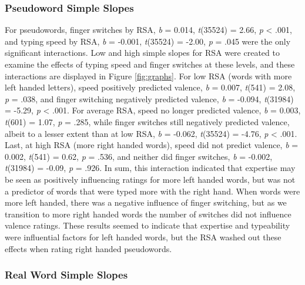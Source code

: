 \documentclass[english,man, mask]{apa6}
\theoremstyle{definition}
\theoremstyle{definition}
\theoremstyle{definition}
\theoremstyle{remark}
\begin{document}
\subsubsection{Pseudoword Simple Slopes}\label{pseudoword-simple-slopes}

For pseudowords, finger switches by RSA, \emph{b} = 0.014,
\emph{t}(35524) = 2.66, \emph{p} \textless{} .001, and typing speed by
RSA, \emph{b} = -0.001, \emph{t}(35524) = -2.00, \emph{p} = .045 were
the only significant interactions. Low and high simple slopes for RSA
were created to examine the effects of typing speed and finger switches
at these levels, and these interactions are displayed in Figure
\ref{fig:graphs}. For low RSA (words with more left handed letters),
speed positively predicted valence, \emph{b} = 0.007, \emph{t}(541) =
2.08, \emph{p} = .038, and finger switching negatively predicted
valence, \emph{b} = -0.094, \emph{t}(31984) = -5.29, \emph{p}
\textless{} .001. For average RSA, speed no longer predicted valence,
\emph{b} = 0.003, \emph{t}(601) = 1.07, \emph{p} = .285, while finger
switches still negatively predicted valence, albeit to a lesser extent
than at low RSA, \emph{b} = -0.062, \emph{t}(35524) = -4.76, \emph{p}
\textless{} .001. Last, at high RSA (more right handed words), speed did
not predict valence, \emph{b} = 0.002, \emph{t}(541) = 0.62, \emph{p} =
.536, and neither did finger switches, \emph{b} = -0.002,
\emph{t}(31984) = -0.09, \emph{p} = .926. In sum, this interaction
indicated that expertise may be seen as positively influencing ratings
for more left handed words, but was not a predictor of words that were
typed more with the right hand. When words were more left handed, there
was a negative influence of finger switching, but as we transition to
more right handed words the number of switches did not influence valence
ratings. These results seemed to indicate that expertise and typeability
were influential factors for left handed words, but the RSA washed out
these effects when rating right handed pseudowords.

\subsubsection{Real Word Simple Slopes}\label{real-word-simple-slopes}
\end{document}
